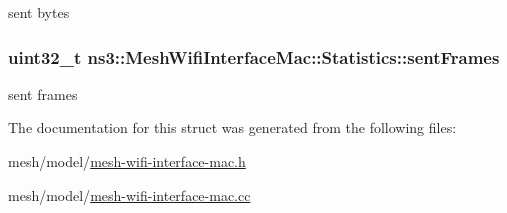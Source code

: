 sent bytes 

\subsubsection[{\texorpdfstring{sent\+Frames}{sentFrames}}]{\setlength{\rightskip}{0pt plus 5cm}uint32\+\_\+t ns3\+::\+Mesh\+Wifi\+Interface\+Mac\+::\+Statistics\+::sent\+Frames}\hypertarget{structns3_1_1MeshWifiInterfaceMac_1_1Statistics_a0ac5f3c2cf39ac74bf402850beb202fb}{}\label{structns3_1_1MeshWifiInterfaceMac_1_1Statistics_a0ac5f3c2cf39ac74bf402850beb202fb}


sent frames 



The documentation for this struct was generated from the following files\+:\begin{DoxyCompactItemize}
\item 
mesh/model/\hyperlink{mesh-wifi-interface-mac_8h}{mesh-\/wifi-\/interface-\/mac.\+h}\item 
mesh/model/\hyperlink{mesh-wifi-interface-mac_8cc}{mesh-\/wifi-\/interface-\/mac.\+cc}\end{DoxyCompactItemize}
